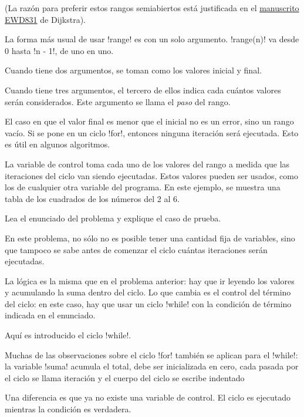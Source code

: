 \documentclass[10pt]{article}
\begin{document}
  (La razón para preferir estos rangos semiabiertos está justificada en el
  \href{http://www.cs.utexas.edu/users/EWD/transcriptions/EWD08xx/EWD831.html}{manuscrito EWD831}
  de Dijkstra).

  La forma más usual de usar \li!range! es con un solo argumento.
  \li!range(n)! va desde 0 hasta \li!n - 1!, de uno en uno.

  Cuando tiene dos argumentos, se toman como los valores inicial y final.

  Cuando tiene tres argumentos, el tercero de ellos indica
  cada cuántos valores serán considerados.
  Este argumento se llama el \emph{paso} del rango.

  El caso en que el valor final es menor que el inicial
  no es un error, sino un rango vacío.
  Si se pone en un ciclo \li!for!,
  entonces ninguna iteración será ejecutada.
  Esto es útil en algunos algoritmos.


  La variable de control toma cada uno de los valores del rango
  a medida que las iteraciones del ciclo van siendo ejecutadas.
  Estos valores pueden ser usados,
  como los de cualquier otra variable del programa.
  En este ejemplo,
  se muestra una tabla de los cuadrados
  de los números del 2 al 6.


  Lea el enunciado del problema y explique el caso de prueba.

  En este problema,
  no sólo no es posible tener una cantidad fija de variables,
  sino que tampoco se sabe antes de comenzar el ciclo
  cuántas iteraciones serán ejecutadas.

  La lógica es la misma que en el problema anterior:
  hay que ir leyendo los valores y acumulando la suma
  dentro del ciclo.
  Lo que cambia es el control del término del ciclo:
  en este caso, hay que usar un ciclo \li!while!
  con la condición de término indicada en el enunciado.


  Aquí es introducido el ciclo \li!while!.

  Muchas de las observaciones sobre el ciclo \li!for!
  también se aplican para el \li!while!:
  la variable \li!suma! acumula el total,
  debe ser inicializada en cero,
  cada pasada por el ciclo se llama iteración y
  el cuerpo del ciclo se escribe indentado

  Una diferencia es que ya no existe una variable de control.
  El ciclo es ejecutado mientras la condición es verdadera.
\end{document}
